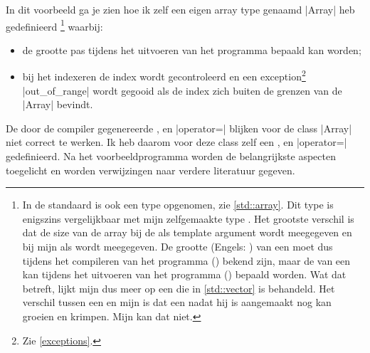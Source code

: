\begin{cpplstShortInline}
In dit voorbeeld ga je zien hoe ik zelf een eigen array type genaamd |Array| heb gedefinieerd%
\footnote{%
    In de standaard \Cpp{}  is ook een type  opgenomen, zie \cref{std::array}.
    Dit type is enigszins vergelijkbaar met mijn zelfgemaakte type .
    Het grootste verschil is dat de size van de array bij de  als template argument wordt meegegeven en bij mijn  als  wordt meegegeven.
    De grootte (Engels: ) van een  moet dus tijdens het compileren van het programma () bekend zijn, maar de  van een  kan tijdens het uitvoeren van het programma () bepaald worden.
    Wat dat betreft, lijkt mijn  dus meer op een  die in \cref{std::vector} is behandeld.
    Het verschil tussen een  en mijn  is dat een  nadat hij is aangemaakt nog kan groeien en krimpen.
    Mijn  kan dat niet.
} waarbij:
\begin{itemize}
    \item de grootte pas tijdens het uitvoeren van het programma bepaald kan worden;
    \item bij het indexeren de index wordt gecontroleerd en een exception\footnote{%
	Zie \cref{exceptions}.	
} |out_of_range| wordt gegooid als de index zich buiten de grenzen van de |Array| bevindt.
\end{itemize}
De door de compiler gegenereerde ,  en |operator=| blijken voor de class |Array| niet correct te werken.
Ik heb daarom voor deze class zelf een ,  en |operator=| gedefinieerd.
Na het voorbeeldprogramma  worden de belangrijkste aspecten toegelicht en worden verwijzingen naar verdere literatuur gegeven.


\end{cpplstShortInline}

